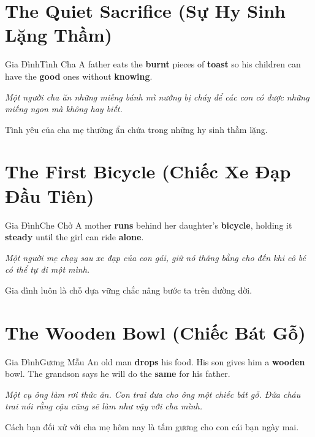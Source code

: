 \section{The Quiet Sacrifice (Sự Hy Sinh Lặng Thầm)}
\begin{truyen}{Gia Đình}{Tình Cha}
A father eats the \textbf{burnt} pieces of \textbf{toast} so his children can have the \textbf{good} ones without \textbf{knowing}.

\textit{Một người cha ăn những miếng bánh mì nướng bị cháy để các con có được những miếng ngon mà không hay biết.}

\begin{baihoc}
Tình yêu của cha mẹ thường ẩn chứa trong những hy sinh thầm lặng.
\end{baihoc}
\end{truyen}

\section{The First Bicycle (Chiếc Xe Đạp Đầu Tiên)}
\begin{truyen}{Gia Đình}{Che Chở}
A mother \textbf{runs} behind her daughter's \textbf{bicycle}, holding it \textbf{steady} until the girl can ride \textbf{alone}.

\textit{Một người mẹ chạy sau xe đạp của con gái, giữ nó thăng bằng cho đến khi cô bé có thể tự đi một mình.}

\begin{baihoc}
Gia đình luôn là chỗ dựa vững chắc nâng bước ta trên đường đời.
\end{baihoc}
\end{truyen}

\section{The Wooden Bowl (Chiếc Bát Gỗ)}
\begin{truyen}{Gia Đình}{Gương Mẫu}
An old man \textbf{drops} his food. His son gives him a \textbf{wooden} bowl. The grandson says he will do the \textbf{same} for his father. 

\textit{Một cụ ông làm rơi thức ăn. Con trai đưa cho ông một chiếc bát gỗ. Đứa cháu trai nói rằng cậu cũng sẽ làm như vậy với cha mình.}

\begin{baihoc}
Cách bạn đối xử với cha mẹ hôm nay là tấm gương cho con cái bạn ngày mai.
\end{baihoc}
\end{truyen}

